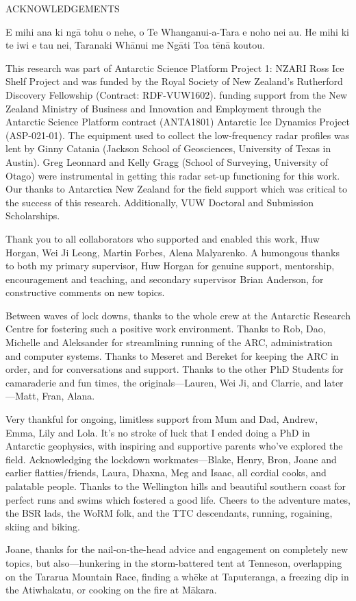 \newpage
{}

\begin{center}
ACKNOWLEDGEMENTS
\end{center}

E mihi ana ki ng\=a tohu o nehe, o Te Whanganui-a-Tara e noho nei au.
He mihi ki te iwi e tau nei, Taranaki Wh\=anui me Ng\=ati Toa t\=en\=a koutou.

This research was part of Antarctic Science Platform Project 1: NZARI Ross Ice Shelf Project and was funded by the Royal Society of New Zealand’s Rutherford Discovery Fellowship (Contract: RDF-VUW1602). 
funding support from the New Zealand Ministry of Business and Innovation and Employment through the Antarctic Science Platform contract (ANTA1801) Antarctic Ice Dynamics Project (ASP-021-01).
The equipment used to collect the low-frequency radar profiles was lent by Ginny Catania (Jackson School of Geosciences, University of Texas in Austin). Greg Leonnard and Kelly Gragg (School of Surveying, University of Otago) were instrumental in getting this radar set-up functioning for this work.
Our thanks to Antarctica New Zealand for the field support which was critical to the success of this research. Additionally, VUW Doctoral and Submission Scholarships.

Thank you to all collaborators who supported and enabled this work, Huw Horgan, Wei Ji Leong, Martin Forbes, Alena Malyarenko. 
A humongous thanks to both my primary supervisor, Huw Horgan for genuine support, mentorship, encouragement and teaching, and secondary supervisor Brian Anderson, for constructive comments on new topics.

Between waves of lock downs, thanks to the whole crew at the Antarctic Research Centre for fostering such a positive work environment. Thanks to Rob, Dao, Michelle and Aleksander for streamlining running of the ARC, administration and computer systems. Thanks to Meseret and Bereket for keeping the ARC in order, and for conversations and support. Thanks to the other PhD Students for camaraderie and fun times, the originals---Lauren, Wei Ji, and Clarrie, and later---Matt, Fran, Alana. 

Very thankful for ongoing, limitless support from Mum and Dad, Andrew, Emma, Lily and Lola.  It's no stroke of luck that I ended doing a PhD in Antarctic geophysics, with inspiring and supportive parents who've explored the field. Acknowledging the lockdown workmates---Blake, Henry, Bron, Joane and earlier flatties/friends, Laura, Dhaxna, Meg and Isaac, all cordial cooks, and palatable people.   
Thanks to the Wellington hills and beautiful southern coast for perfect runs and swims which fostered a good life. Cheers to the adventure mates, the BSR lads, the WoRM folk, and the TTC descendants, running, rogaining, skiing and biking.

Joane, thanks for the nail-on-the-head advice and engagement on completely new topics, but also---hunkering in the storm-battered tent at Tenneson, overlapping on the Tararua Mountain Race, finding a wh\=eke at Taputeranga, a freezing dip in the Atiwhakatu, or cooking on the fire at M\=akara. 